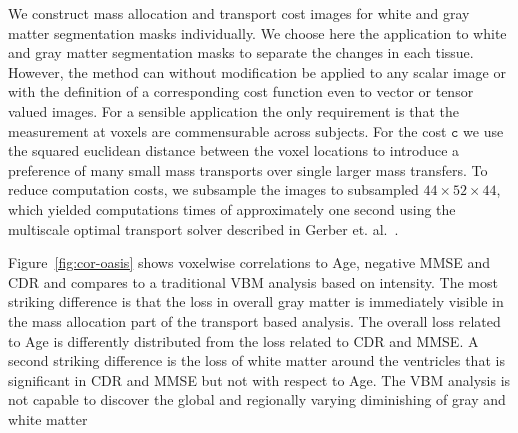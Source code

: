 \documentclass{llncs}
\newcommand{\cost}[0]{\mathtt{c}}
\begin{document}
We construct mass allocation and transport cost images for white and
gray matter segmentation masks individually. We choose here the application to
white and gray matter segmentation masks to separate the changes in each
tissue. However, the method can without modification be applied to any scalar
image or with the definition of a corresponding cost function even to vector or
tensor valued images. For a sensible application the only requirement is that
the measurement at voxels are commensurable across subjects. For the cost
$\cost$ we use the squared euclidean distance between the voxel locations to
introduce a preference of many small mass transports over single larger mass
transfers.  To reduce computation costs, we subsample the images to subsampled
$44 \times 52 \times 44$, which yielded computations times of approximately one
second using the multiscale optimal transport solver described in Gerber et.
al.~\cite{gerber2017multiscale}.

Figure~\ref{fig:cor-oasis} shows voxelwise correlations to Age, negative MMSE
and CDR and compares to a traditional VBM analysis based on intensity. The most
striking difference is that the loss in overall gray matter is immediately
visible in the mass allocation part of the transport based analysis. The
overall loss related to Age is differently distributed from the loss related to
CDR and MMSE. A second striking difference is the loss of white matter around
the ventricles that is significant in CDR and MMSE but not with respect to Age.
The VBM analysis is not capable to discover the global and regionally varying
diminishing of gray and white matter  
\end{document}
